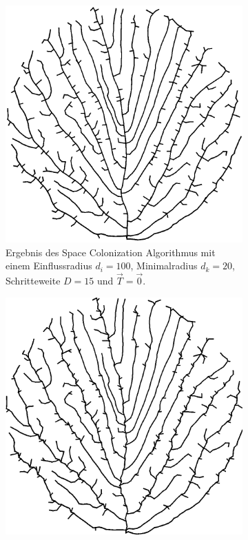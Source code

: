 \begin{figure} [hbtp]
\begin{subfigure}[t]{.4\textwidth}
		\includegraphics[width=\linewidth]{images/SCA_Extended2.png}
		\caption{Ergebnis des Space Colonization Algorithmus mit einem Einflussradius $d_i = 100$, Minimalradius $d_k = 20$, Schritteweite $D = 15$ und $\overrightarrow{T} = \overrightarrow{0}$.}
		\label{subfig:SCA_Extended2}
	\end{subfigure}
	\begin{subfigure}[t]{.4\textwidth}
		\centering
		\includegraphics[width=\linewidth]{images/SCA_Extended3.png}

\end{subfigure}
\end{figure}
